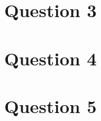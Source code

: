 \documentclass[a4paper]{article}
\begin{document}
\section{Question 3}

\section{Question 4}

\section{Question 5}


% 
\end{document}
